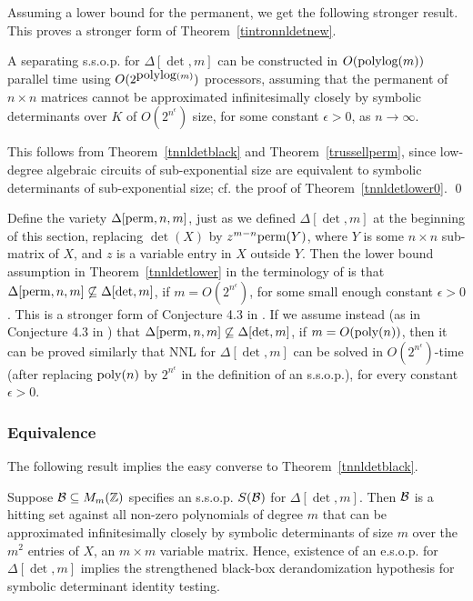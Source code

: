 \documentclass[11pt]{article}
\begin{document}
Assuming a lower bound for the permanent, we  get  the following stronger result.
This proves a stronger form of Theorem~\ref{tintronnldetnew}.

\begin{theorem} \label{tnnldetlower}
A separating  s.s.o.p. for $\Delta[\det,m]$ can be constructed in $O({\mbox {polylog}}(m))$ 
parallel time using 
$O(2^{{\mbox {polylog}}(m)})$ processors,
assuming that the permanent of $n \times n$ matrices 
cannot be approximated infinitesimally closely  by  symbolic determinants  over $K$ of  $O(2^{n^\epsilon})$ size, for some
constant $\epsilon >0$, as $n\rightarrow \infty$.
\end{theorem}


\proof This  follows from Theorem~\ref{tnnldetblack} and Theorem~\ref{trussellperm},
since low-degree algebraic circuits of sub-exponential size are equivalent  to
symbolic determinants of sub-exponential size; cf. 
the proof of Theorem~\ref{tnnldetlower0}. \qed 


Define the variety $\Delta[{\mbox {perm}},n,m]$, just as we defined $\Delta[\det,m]$ at the beginning of this section, replacing 
$\det(X)$   by $z^{m-n}{\mbox {perm}}(Y)$, where $Y$ is some $n\times n$ sub-matrix of $X$, and $z$ is a variable entry in $X$ outside $Y$.
Then the lower bound assumption in Theorem~\ref{tnnldetlower} in the terminology of \cite{GCT1}  is that 
$\Delta[{\mbox {perm}},n,m] \not \subseteq \Delta[\det,m]$, if $m=O(2^{n^\epsilon})$, for some small enough constant $\epsilon >0$.
This is a stronger form of Conjecture 4.3 in \cite{GCT1}.
If we assume instead (as in Conjecture 4.3 in 
\cite{GCT1}) that $\Delta[{\mbox {perm}},n,m] \not \subseteq \Delta[\det,m]$,
if $m=O({\mbox {poly}}(n))$, then it can be proved  similarly that NNL for $\Delta[\det,m]$ can be solved in  $O(2^{n^\epsilon})$-time
(after  replacing ${\mbox {poly}}(n)$ by $2^{n^\epsilon}$ in the definition of an s.s.o.p.), for every constant $\epsilon >0$.

\subsubsection{Equivalence} \label{sequivalencedet}
The following result implies the easy converse to  Theorem~\ref{tnnldetblack}. 

\begin{lemma} \label{lnnldetblack}
Suppose ${\cal B} \subseteq M_m(\mathbb{Z})$ specifies an  s.s.o.p. $S({\cal B})$ for $\Delta[\det,m]$. 
Then ${\cal B}$ is a hitting set against all non-zero polynomials of degree $m$ that can be approximated infinitesimally closely by
symbolic determinants
of size $m$ over the $m^2$  entries of $X$, an $m\times m$ variable matrix. 
Hence, existence of an e.s.o.p. for  $\Delta[\det,m]$ implies the strengthened black-box derandomization
hypothesis for  symbolic determinant identity testing. 
\end{lemma}
\end{document}
